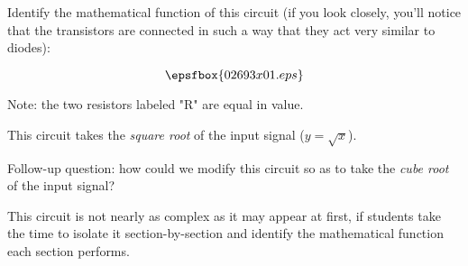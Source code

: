 

Identify the mathematical function of this circuit (if you look closely, you'll notice that the transistors are connected in such a way that they act very similar to diodes):

$$\epsfbox{02693x01.eps}$$

Note: the two resistors labeled "R" are equal in value.







This circuit takes the {\it square root} of the input signal ($y = \sqrt{x}$).

\vskip 10pt

Follow-up question: how could we modify this circuit so as to take the {\it cube root} of the input signal?







This circuit is not nearly as complex as it may appear at first, if students take the time to isolate it section-by-section and identify the mathematical function each section performs.




